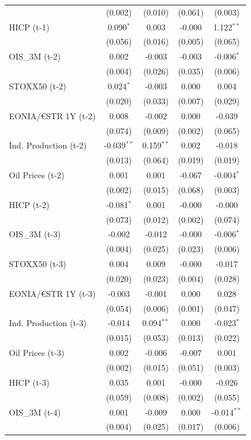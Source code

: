 \begin{longtable}[t]{lcccc}
 & (0.002) & (0.010) & (0.061) & (0.003)\\
HICP (t-1) & 0.090$^{*}$ & 0.003 & -0.000 & 1.122$^{**}$\\
 & (0.056) & (0.016) & (0.005) & (0.065)\\
OIS\_3M (t-2) & 0.002 & -0.003 & -0.003 & -0.006$^{*}$\\
 & (0.004) & (0.026) & (0.035) & (0.006)\\
STOXX50 (t-2) & 0.024$^{*}$ & -0.003 & 0.000 & 0.004\\
 & (0.020) & (0.033) & (0.007) & (0.029)\\
EONIA/€STR 1Y (t-2) & 0.008 & -0.002 & 0.000 & -0.039\\
 & (0.074) & (0.009) & (0.002) & (0.065)\\
Ind. Production (t-2) & -0.039$^{**}$ & 0.159$^{**}$ & 0.002 & -0.018\\
 & (0.013) & (0.064) & (0.019) & (0.019)\\
Oil Prices (t-2) & 0.001 & 0.001 & -0.067 & -0.004$^{*}$\\
 & (0.002) & (0.015) & (0.068) & (0.003)\\
HICP (t-2) & -0.081$^{*}$ & 0.001 & -0.000 & -0.000\\
 & (0.073) & (0.012) & (0.002) & (0.074)\\
OIS\_3M (t-3) & -0.002 & -0.012 & -0.000 & -0.006$^{*}$\\
 & (0.004) & (0.025) & (0.023) & (0.006)\\
STOXX50 (t-3) & 0.004 & 0.009 & -0.000 & -0.017\\
 & (0.020) & (0.023) & (0.004) & (0.028)\\
EONIA/€STR 1Y (t-3) & -0.003 & -0.001 & 0.000 & 0.028\\
 & (0.054) & (0.006) & (0.001) & (0.047)\\
Ind. Production (t-3) & -0.014 & 0.094$^{**}$ & 0.000 & -0.023$^{*}$\\
 & (0.015) & (0.053) & (0.013) & (0.022)\\
Oil Prices (t-3) & 0.002 & -0.006 & -0.007 & 0.001\\
 & (0.002) & (0.015) & (0.051) & (0.003)\\
HICP (t-3) & 0.035 & 0.001 & -0.000 & -0.026\\
 & (0.059) & (0.008) & (0.002) & (0.055)\\
OIS\_3M (t-4) & 0.001 & -0.009 & 0.000 & -0.014$^{**}$\\
 & (0.004) & (0.025) & (0.017) & (0.006)\\

\end{longtable}
